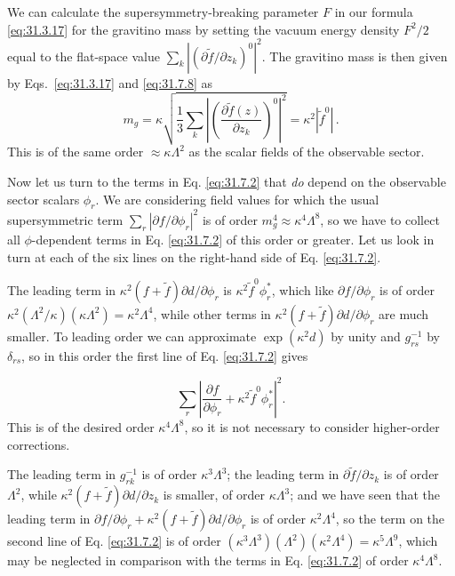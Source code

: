 We can calculate the supersymmetry-breaking parameter \(F\) in our formula
\eqref{eq:31.3.17} for the gravitino mass by setting the vacuum energy
density \(F^2/2\) equal to the flat-space value
\(\sum_k|(\partial\widetilde f/\partial z_k)^0|^2\). The gravitino mass is
then given by Eqs.~\eqref{eq:31.3.17} and \eqref{eq:31.7.8} as
\begin{equation}
  m_g=\kappa\sqrt{
    \frac13\sum_k\left|
      \left(\frac{\partial\widetilde f(z)}{\partial z_k}\right)^0
    \right|^2}
  =\kappa^2|\widetilde f^0|\,.
  \tag{31.7.9}\label{eq:31.7.9}
\end{equation}
This is of the same order \(\approx\kappa\Lambda^2\) as the scalar fields
of the observable sector.

Now let us turn to the terms in Eq. \eqref{eq:31.7.2} that \emph{do} depend
on the observable sector scalars \(\phi_r\). We are considering field values
for which the usual supersymmetric term
\(\sum_r|\partial f/\partial\phi_r|^2\) is of order
\(m_g^4\approx\kappa^4\Lambda^8\), so we have to collect all
\(\phi\)-dependent terms in Eq. \eqref{eq:31.7.2} of this order or greater.
Let us look in turn at each of the six lines on the right-hand side of
Eq. \eqref{eq:31.7.2}.

\begin{sloppypar}
The leading term in
\(\kappa^2(f+\widetilde f)\partial d/\partial\phi_r\) is
\(\kappa^2\widetilde f^0\phi_r^*\), which like
\(\partial f/\partial\phi_r\) is of order
\(\kappa^2(\Lambda^2/\kappa)(\kappa\Lambda^2)
\allowbreak=\kappa^2\Lambda^4\), while
other terms in \(\kappa^2(f+\widetilde f)\partial d/\partial\phi_r\) are
much smaller. To leading order we can approximate \(\exp(\kappa^2d)\) by
unity and \(g_{rs}^{-1}\) by \(\delta_{rs}\), so in this order the first line
of Eq. \eqref{eq:31.7.2} gives
\end{sloppypar}
\[
  \sum_r\left|
    \frac{\partial f}{\partial\phi_r}
    +\kappa^2\widetilde f^0\phi_r^*
  \right|^2 .
\]
This is of the desired order \(\kappa^4\Lambda^8\), so it is not necessary
to consider higher-order corrections.

The leading term in \(g_{rk}^{-1}\) is of order
\(\kappa^3\Lambda^3\); the leading term in
\(\partial\widetilde f/\partial z_k\) is of order \(\Lambda^2\), while
\(\kappa^2(f+\widetilde f)\partial d/\partial z_k\) is smaller, of order
\(\kappa\Lambda^3\); and we have seen that the leading term in
\(\partial f/\partial\phi_r+
\kappa^2(f+\widetilde f)\partial d/\partial\phi_r\) is of order
\(\kappa^2\Lambda^4\), so the term on the second line of
Eq. \eqref{eq:31.7.2} is of order
\((\kappa^3\Lambda^3)(\Lambda^2)(\kappa^2\Lambda^4)
=\kappa^5\Lambda^9\), which may be neglected in comparison with the terms
in Eq. \eqref{eq:31.7.2} of order \(\kappa^4\Lambda^8\).

